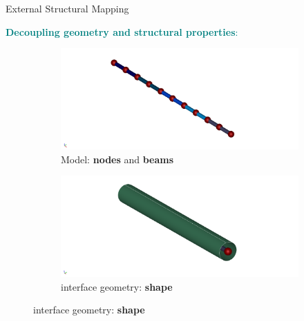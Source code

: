 \documentclass[10pt,t]{beamer}
\begin{document}
\begin{frame}{External Structural Mapping}

\textcolor{teal}{\textbf{Decoupling geometry and structural properties}:} 

\begin{figure}
  \begin{subfigure}[t]{.486\textwidth}
    \centering
    \includegraphics[width=\linewidth]{images/beams_1a.png}
    \caption{Model: \textbf{nodes} and \textbf{beams}}
  \end{subfigure}
  \hfill
  \begin{subfigure}[t]{.486\textwidth}
    \centering
    \includegraphics[width=\linewidth]{images/interf_1a.png}
    \caption{interface geometry: \textbf{shape}}
  \end{subfigure}

  \bigskip


\end{figure}
\end{frame}
\end{document}
